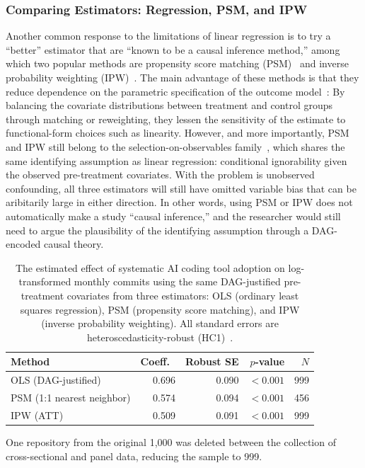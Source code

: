 \subsubsection{Comparing Estimators: Regression, PSM, and IPW}
\label{sec:estimator-convergence}

Another common response to the limitations of linear regression is to try a ``better'' estimator that are ``known to be a causal inference method,'' among which two popular methods are propensity score matching (PSM)~\cite{rosenbaum1983central} and inverse probability weighting (IPW)~\cite{horvitz1952generalization}.
The main advantage of these methods is that they reduce dependence on the parametric specification of the outcome model~\cite{ho2007matching}: By balancing the covariate distributions between treatment and control groups through matching or reweighting, they lessen the sensitivity of the estimate to functional-form choices such as linearity.
However, and more importantly, PSM and IPW still belong to the selection-on-observables family~\cite{imbens2009recent}, which shares the same identifying assumption as linear regression: conditional ignorability given the observed pre-treatment covariates.
With the problem is unobserved confounding, all three estimators will still have omitted variable bias that can be aribitarily large in either direction.
In other words, using PSM or IPW does not automatically make a study ``causal inference,'' and the researcher would still need to argue the plausibility of the identifying assumption through a DAG-encoded causal theory.

\begin{table}[t]
  \centering
  \caption{The estimated effect of systematic AI coding tool adoption on log-transformed monthly commits using the same DAG-justified pre-treatment covariates from three estimators: OLS (ordinary least squares regression), PSM (propensity score matching), and IPW (inverse probability weighting).
  \label{tab:three-estimators}
  All standard errors are heteroscedasticity-robust (HC1)~\cite{mackinnon1985heteroskedasticity}.}
  \begin{threeparttable}
  \small
  \begin{tabular}{lrrrr}
  \toprule
  Method & Coeff.\ & Robust SE & $p$-value & $N$ \\
  \midrule
  OLS (DAG-justified) & 0.696 & 0.090 & ${<}0.001$ & 999\tnote{a} \\
  PSM (1:1 nearest neighbor) & 0.574 & 0.094 & ${<}0.001$ & 456 \\
  IPW (ATT) & 0.509 & 0.091 & ${<}0.001$ & 999\tnote{a} \\
  \bottomrule
  \end{tabular}
  \begin{tablenotes}
  \footnotesize
  \item[a] One repository from the original 1,000 was deleted between the collection of cross-sectional and panel data, reducing the sample to 999.
  \end{tablenotes}
  \end{threeparttable}
  \end{table}

